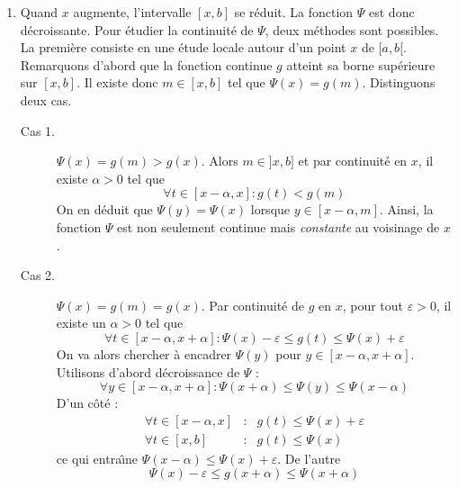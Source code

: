 \begin{enumerate}
 \item Quand $x$ augmente, l'intervalle $[ x,b] $ se r{\'e}duit. La fonction $\Psi $ est donc d{\'e}croissante.\newline
 Pour {\'e}tudier la continuit{\'e} de $\Psi$, deux méthodes sont possibles.\newline
La première consiste en une étude locale autour d'un point $x$ de $[a,b[ $.\newline
Remarquons d'abord que la fonction continue $g$ atteint sa borne sup{\'e}rieure sur $[x,b] $. Il existe donc $m\in [x,b]$ tel que $\Psi (x)=g(m)$. Distinguons deux cas.
\begin{description}
 \item[Cas 1.] $\Psi (x)=g(m)>g(x)$.\newline
Alors $m\in ] x,b] $ et par continuité en $x$,  il existe $\alpha >0$ tel que
\begin{displaymath}
 \forall t \in [x-\alpha,x]  : g(t)<g(m)
\end{displaymath}
On en d{\'e}duit que $\Psi(y)=\Psi(x)$ lorsque $y\in [x-\alpha ,m]$. Ainsi, la fonction $\Psi $ est non seulement continue mais \emph{constante} au voisinage de $x$.
\item[Cas 2.] $\Psi (x)=g(m)=g(x)$.\newline
Par continuit{\'e} de $g$ en $x$, pour tout $\varepsilon >0$, il existe un $\alpha >0$ tel que 
\begin{displaymath}
 \forall t\in [x-\alpha ,x+\alpha]  :  \Psi(x)-\varepsilon \leq g(t)\leq \Psi (x)+\varepsilon 
\end{displaymath}
On va alors chercher à encadrer $\Psi(y)$ pour $y\in [x-\alpha ,x+\alpha]$.\newline
Utilisons d'abord d{\'e}croissance de $\Psi$ :
\begin{displaymath}
\forall y\in [x-\alpha ,x+\alpha] : \Psi(x+\alpha )\leq \Psi(y)\leq \Psi (x-\alpha)
\end{displaymath}
D'un côté :
\begin{align*}
\forall t\in [ x-\alpha ,x] &:& g(t)\leq \Psi (x)+\varepsilon \\
\forall t\in [ x,b] &:& g(t)\leq \Psi (x)
\end{align*}
ce qui entra\^{\i }ne $\Psi (x-\alpha )\leq \Psi (x)+\varepsilon$.\newline
De l'autre 
\begin{displaymath}
 \Psi(x)-\varepsilon \leq g(x+\alpha)\leq \Psi(x+\alpha)
\end{displaymath}

\end{description}
\end{enumerate}
